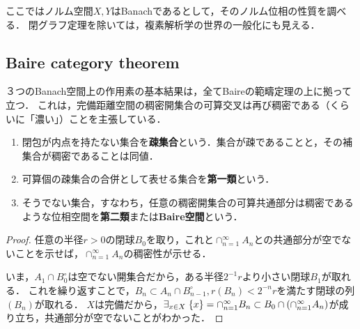 \documentclass[uplatex,dvipdfmx]{jsreport}
\begin{document}
\begin{tcolorbox}[colframe=ForestGreen, colback=ForestGreen!10!white,breakable,colbacktitle=ForestGreen!40!white,coltitle=black,fonttitle=\bfseries\sffamily,
title=]
    ここではノルム空間$X,Y$はBanachであるとして，そのノルム位相の性質を調べる．
    閉グラフ定理を除いては，複素解析学の世界の一般化にも見える．
\end{tcolorbox}

\subsection{Baire category theorem}

\begin{tcolorbox}[colframe=ForestGreen, colback=ForestGreen!10!white,breakable,colbacktitle=ForestGreen!40!white,coltitle=black,fonttitle=\bfseries\sffamily,
title=]
    ３つのBanach空間上の作用素の基本結果は，全てBaireの範疇定理の上に拠って立つ．
    これは，完備距離空間の稠密開集合の可算交叉は再び稠密である（くらいに「濃い」）ことを主張している．
\end{tcolorbox}

\begin{definition}\mbox{}
    \begin{enumerate}
        \item 閉包が内点を持たない集合を\textbf{疎集合}という．集合が疎であることと，その補集合が稠密であることは同値．
        \item 可算個の疎集合の合併として表せる集合を\textbf{第一類}という．
        \item そうでない集合，すなわち，任意の稠密開集合の可算共通部分は稠密であるような位相空間を\textbf{第二類}または\textbf{Baire空間}という．
    \end{enumerate}
\end{definition}
\begin{proof}
    任意の半径$r>0$の閉球$B_0$を取り，これと$\cap_{n=1}^\infty A_n$との共通部分が空でないことを示せば，$\cap_{n=1}^\infty A_n$の稠密性が示せる．

    いま，$A_1\cap B_0^\circ$は空でない開集合だから，ある半径$2^{-1}r$より小さい閉球$B_1$が取れる．
    これを繰り返すことで，$B_n\subset A_n\cap B^\circ_{n-1},r(B_n)<2^{-n}r$を満たす閉球の列$(B_n)$が取れる．
    $X$は完備だから，$\exists_{x\in X}\;\{x\}=\cap_{n=1}^\infty B_n\subset B_0\cap\left(\cap_{n=1}^\infty A_n\right)$が成り立ち，共通部分が空でないことがわかった．
\end{proof}
\end{document}
